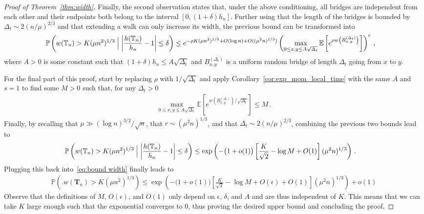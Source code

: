 \documentclass{article}
\newcommand{\pr}{\mathbb{P}}								%
\newcommand{\Prob}[1]{\pr\left(#1\right)}					%
\newcommand{\CProb}[2]{\pr\left(#1 \Bigm| #2\right)}	%
\newcommand{\E}{\mathbb{E}}								%
\newcommand{\Exp}[1]{\E\left[#1\right]}					%
\newcommand{\1}{\mathbbm{1}}								%
\theoremstyle{definition}
\numberwithin{equation}{section}
\newcommand{\bT}{\mathbf T}
\newcommand{\T}{\mathbb T}
\begin{document}
\begin{proof}[Proof of Theorem~\ref{thm:width}]
    Finally, the second observation states that, under the above conditioning, all bridges are independent from each other and their endpoints both belong to the interval $[0,(1+\delta)h_n]$.
    Further using that the length of the bridges is bounded by $\Delta_t\sim2(n/\mu)^{2/3}$ and that extending a walk can only increase its width, the previous bound can be transformed into
    \begin{align*}
        \CProb{w(\T_n)>K(\mu n^2)^{1/3}}{\left|\frac{h(\T_n)}{h_n}-1\right|\leq\delta}
        &\leq e^{-\rho K(\mu n^2)^{1/3}+O(\log n)+O((\mu^2n)^{1/3})}\left(\max_{0\leq x,y\leq A\sqrt{\Delta_t}}\Exp{e^{\rho w\left(B^{(\Delta_t)}_{x,y}\right)}}\right)^r\,,
    \end{align*}
    where $A>0$ is some constant such that $(1+\delta)h_n\leq A\sqrt{\Delta_t}$ and $B^{(\Delta_t)}_{x,y}$ is a uniform random bridge of length $\Delta_t$ going from $x$ to $y$.

    For the final part of this proof, start by replacing $\rho$ with $1/\sqrt{\Delta_t}$ and apply Corollary~\ref{cor:exp_mom_local_time} with the same $A$ and $s=1$ to find some $M>0$ such that, for any $\Delta_t>0$
    \begin{align*}
        \max_{0\leq x,y\leq A\sqrt{\Delta_t}}\Exp{e^{w\left(B^{(\Delta_t)}_{x,y}\right)/\sqrt{\Delta_t}}}\leq M\,.
    \end{align*}
    Finally, by recalling that $\mu\gg(\log n)^{3/2}/\sqrt{n}$, that $r\sim(\mu^2n)^{1/3}$, and that $\Delta_t\sim2(n/\mu)^{2/3}$, combining the previous two bounds lead to
    \begin{align*}
        \CProb{w(\T_n)>K(\mu n^2)^{1/3}}{\left|\frac{h(\T_n)}{h_n}-1\right|\leq\delta}&\leq\exp\left(-\big(1+o(1)\big)\left[\frac{K}{\sqrt{2}}-\log M+O(1)\right](\mu^2n)^{1/3}\right)\,.
    \end{align*}
    Plugging this back into~\eqref{eq:bound width} finally leads to
    \begin{align*}
        \Prob{\Big.w(\bT_n)>K(\mu n^2)^{1/3}}\leq\exp\left(-\big(1+o(1)\big)\left[\frac{K}{\sqrt{2}}-\log M+O(\epsilon)+O(1)\right](\mu^2n)^{1/3}\right)+o(1)
    \end{align*}
    Observe that the definitions of $M$, $O(\epsilon)$, and $O(1)$ only depend on $\epsilon$, $\delta$, and $A$ and are thus independent of $K$.
    This means that we can take $K$ large enough such that the exponential converges to $0$, thus proving the desired upper bound and concluding the proof.
\end{proof}
\end{document}
